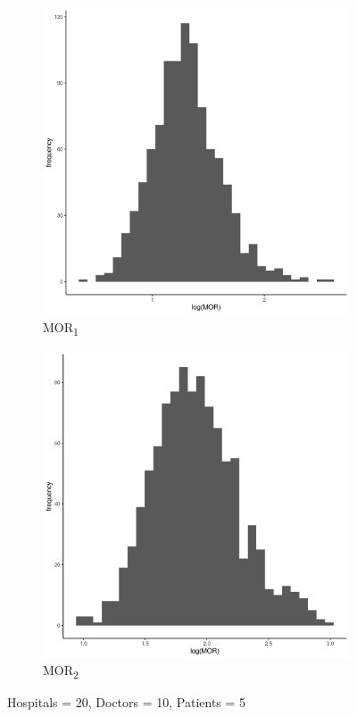 \documentclass[
  letterpaper,
  DIV=11,
  numbers=noendperiod,
  titlepage]{scrartcl}
\begin{document}
\begin{figure}
\centering
\begin{subfigure}{.49\textwidth}
    \centering
    \includegraphics[width=.95\linewidth]{../../plots/three-lvl-ran-int/low-prev/hist_20_10_5_three_lvl_low_prev_mor1.png}  
    \caption{MOR\textsubscript{1}}
    \label{l20m10n51}
\end{subfigure}
\begin{subfigure}{.49\textwidth}
    \centering
    \includegraphics[width=.95\linewidth]{../../plots/three-lvl-ran-int/low-prev/hist_20_10_5_three_lvl_low_prev_mor2.png}  
    \caption{MOR\textsubscript{2}}
    \label{l20m10n52}
\end{subfigure}
\caption{Hospitals = 20, Doctors = 10, Patients = 5}
\label{mor1}
\end{figure}
\end{document}
